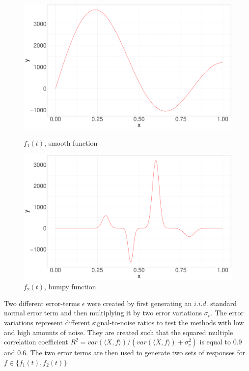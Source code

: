 \documentclass[11pt,twoside,a4paper]{article}
\begin{document}
		\vspace{0.1cm}
		\begin{figure}
			\centering
			\begin{minipage}{.5\textwidth}
				\centering
  				\includegraphics[width=\textwidth]{../Graphics/f1_plot.pdf}
  				\caption{$f_1(t)$, smooth function}
  				\label{fig:test1}
			\end{minipage}%
			\begin{minipage}{.5\textwidth}
	  			\centering
  				\includegraphics[width=\textwidth]{../Graphics/f2_plot.pdf}
  				\caption{$f_2(t)$, bumpy function}
  				\label{fig:test2}
			\end{minipage}
		\end{figure}
		
		 Two different error-terms $\epsilon$ were created by first generating an $i.i.d.$ standard normal error term and then multiplying it by two error variations $\sigma_e $. The error variations represent different signal-to-noise ratios to test the methods with low and high amounts of noise. They are created such that the squared multiple correlation coefficient $R^2 = var(\langle X, f\rangle) / (var(\langle X, f\rangle) + \sigma^2_{e})$ is equal to 0.9 and 0.6. The two error terms are then used to generate two sets of responses for $f \in \{f_1(t), f_2(t)\}$
		
\end{document}
